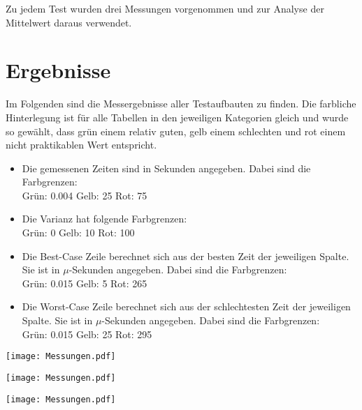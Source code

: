 \documentclass{scrreprt}
\begin{document}
Zu jedem Test wurden drei Messungen vorgenommen und zur Analyse der Mittelwert daraus verwendet. 

\section{Ergebnisse}
\label{sec:results}
Im Folgenden sind die Messergebnisse aller Testaufbauten zu finden. Die farbliche Hinterlegung ist für alle Tabellen in den jeweiligen Kategorien gleich und wurde so gewählt, dass grün einem relativ guten, gelb einem schlechten und rot einem nicht praktikablen Wert entspricht.
\begin{itemize}
\item Die gemessenen Zeiten sind in Sekunden angegeben. Dabei sind die Farbgrenzen:\\
Grün: 0.004\qquad
Gelb: 25\qquad
Rot:  75
\item Die Varianz hat folgende Farbgrenzen:\\
Grün:	0\qquad
Gelb:	10\qquad
Rot:	100
\item Die Best-Case Zeile berechnet sich aus der besten Zeit der jeweiligen Spalte. Sie ist in $\mu$-Sekunden angegeben. Dabei sind die Farbgrenzen:\\
Grün:	0.015\qquad
Gelb:	5\qquad
Rot:	265
\item Die Worst-Case Zeile berechnet sich aus der schlechtesten Zeit der jeweiligen Spalte. Sie ist in $\mu$-Sekunden angegeben. Dabei sind die Farbgrenzen:\\
Grün:	0.015\qquad
Gelb:	25\qquad
Rot:	295
\end{itemize}

\begin{table}[!ht]
\centering
\texttt{[image: Messungen.pdf]}
\caption{Messergebnisse im Modus \lstinline|local| (mit einer Maschine)}
\label{tab:local}
\end{table}

\begin{table}[!ht]
\centering
\texttt{[image: Messungen.pdf]}
\caption{Messergebnisse im Modus \lstinline|remote| (mit zwei Maschinen)}
\label{tab:remote}
\end{table}

\begin{table}[!ht]
\centering
\texttt{[image: Messungen.pdf]}
\caption{Messergebnisse im Modus \lstinline|distributed| mit einer Maschine}
\label{tab:dist1}
\end{table}
\end{document}
